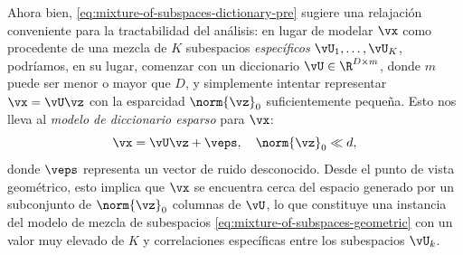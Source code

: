 \documentclass[../../book-main.tex]{subfiles}
\begin{document}
Ahora bien, \eqref{eq:mixture-of-subspaces-dictionary-pre} sugiere una
relajación conveniente para la tractabilidad del análisis: en lugar de
modelar $\vx$ como procedente de una mezcla de $K$ subespacios \textit{específicos}
$\vU_1, \dots, \vU_K$, podríamos, en su lugar, comenzar con un
diccionario $\vU \in \R^{D \times m}$, donde $m$ puede ser menor o
mayor que $D$, y simplemente intentar representar $\vx = \vU \vz$ con
la esparcidad $\norm{\vz}_0$ suficientemente pequeña.
Esto nos lleva al \textit{modelo de diccionario esparso} para $\vx$:
\begin{equation}\label{eq:mixture-of-subspaces-dictionary}
    \vx =  \vU \vz + \veps,
    \quad
    \norm{\vz}_0 \ll d,
\end{equation}
donde $\veps$ representa un vector de ruido desconocido. Desde el punto de 
vista geométrico, esto implica que $\vx$ se encuentra cerca del espacio 
generado por un subconjunto de $\norm{\vz}_0$ columnas de $\vU$,
lo que constituye una instancia del modelo de mezcla de subespacios
\eqref{eq:mixture-of-subspaces-geometric} con un valor muy elevado de
$K$ y correlaciones específicas entre los subespacios $\vU_k$.
\end{document}
